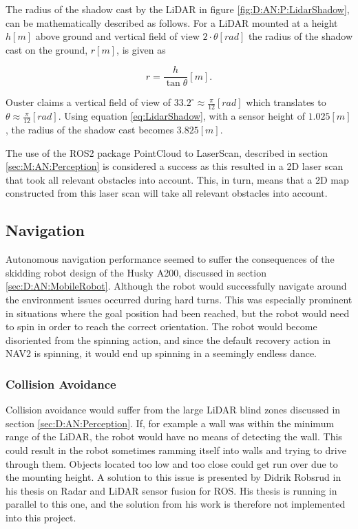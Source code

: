 The radius of the shadow cast by the LiDAR in figure \ref{fig:D:AN:P:LidarShadow}, can be mathematically described as follows. For a LiDAR mounted at a height $h[m]$ above ground and vertical field of view $2\cdot\theta[rad]$ the radius of the shadow cast on the ground, $r[m]$, is given as

\begin{equation} \label{eq:LidarShadow}
    r = \frac{h}{\tan{\theta}}[m].
\end{equation}

Ouster claims a vertical field of view of $33.2^\circ \approx\frac{\pi}{12}[rad]$ \cite{OS1_datasheet} which translates to $\theta\approx\frac{\pi}{12}[rad]$. Using equation \ref{eq:LidarShadow}, with a sensor height of $1.025[m]$, the radius of the shadow cast becomes $3.825[m]$.

The use of the ROS2 package PointCloud to LaserScan, described in section \ref{sec:M:AN:Perception} is considered a success as this resulted in a 2D laser scan that took all relevant obstacles into account. This, in turn, means that a 2D map constructed from this laser scan will take all relevant obstacles into account.

\subsection{Navigation}\label{sec:D:AN:Navigation}
Autonomous navigation performance seemed to suffer the consequences of the skidding robot design of the Husky A200, discussed in section \ref{sec:D:AN:MobileRobot}. Although the robot would successfully navigate around the environment issues occurred during hard turns. This was especially prominent in situations where the goal position had been reached, but the robot would need to spin in order to reach the correct orientation. The robot would become disoriented from the spinning action, and since the default recovery action in NAV2 is spinning, it would end up spinning in a seemingly endless dance.

\subsubsection{Collision Avoidance}
Collision avoidance would suffer from the large LiDAR blind zones discussed in section \ref{sec:D:AN:Perception}. If, for example a wall was within the minimum range of the LiDAR, the robot would have no means of detecting the wall. This could result in the robot sometimes ramming itself into walls and trying to drive through them. Objects located too low and too close could get run over due to the mounting height. A solution to this issue is presented by Didrik Robsrud in his thesis on Radar and LiDAR sensor fusion for ROS. His thesis is running in parallel to this one, and the solution from his work is therefore not implemented into this project.

